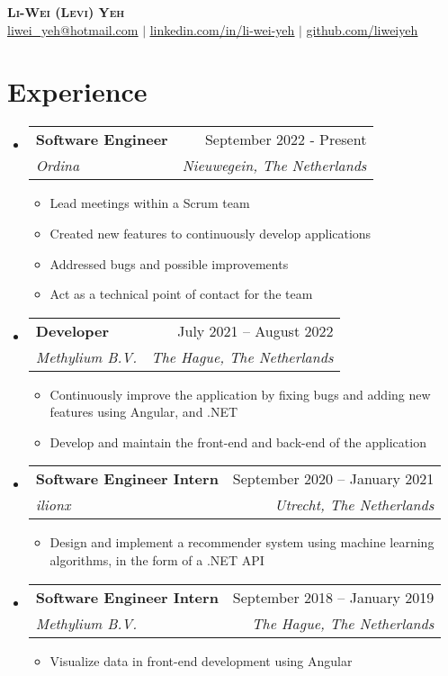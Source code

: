 \documentclass[letterpaper,11pt]{article}
\makeatletter
\newcommand{\resumeItem}[1]{
	\item\small{
		{#1 \vspace{-2pt}}
	}
}
\newcommand{\resumeSubheading}[4]{
	\vspace{4pt}\item
	\begin{tabular*}{0.97\textwidth}[t]{l@{\extracolsep{\fill}}r}
		\textbf{#1} & #2 \\
		\textit{\small#3} & \textit{\small #4} \\
	\end{tabular*}\vspace{-7pt}
}
\newcommand{\resumeSubHeadingListStart}{\begin{itemize}[leftmargin=0.15in, label={}]}
\newcommand{\resumeSubHeadingListEnd}{\end{itemize}}
\newcommand{\resumeItemListStart}{\begin{itemize}}
\newcommand{\resumeItemListEnd}{\end{itemize}\vspace{-5pt}}
\makeatother
\begin{document}
	
	\begin{center}
		\textbf{\Huge \scshape Li-Wei (Levi) Yeh} \\ \vspace{1pt}
		\small \href{mailto:liwei_yeh@hotmail.com}{\underline{liwei\_yeh@hotmail.com}} $|$ 
		\href{https://www.linkedin.com/in/li-wei-yeh/}{\underline{linkedin.com/in/li-wei-yeh}} $|$
		\href{https://github.com/LiWeiYeh/}{\underline{github.com/liweiyeh}}
	\end{center}
	
	
	
	\section{Experience}
	\resumeSubHeadingListStart
	
	\resumeSubheading
	{Software Engineer}{September 2022 - Present}
	{Ordina}{Nieuwegein, The Netherlands}
	\resumeItemListStart
	\resumeItem{Lead meetings within a Scrum team}\\
	\resumeItem{Created new features to continuously develop applications}\\
	\resumeItem{Addressed bugs and possible improvements}\\
	\resumeItem{Act as a technical point of contact for the team}\\
	\resumeItemListEnd
	
	\resumeSubheading
	{Developer}{July 2021 – August 2022}
	{Methylium B.V.}{The Hague, The Netherlands}
	\resumeItemListStart
	\resumeItem{Continuously improve the application by fixing bugs and adding new\\ 
		features using Angular, and .NET}
	\resumeItem{Develop and maintain the front-end and back-end of the application}
	\resumeItemListEnd
	
	\resumeSubheading
	{Software Engineer Intern}{September 2020 -- January 2021}
	{ilionx}{Utrecht, The Netherlands}
	\resumeItemListStart
	\resumeItem{Design and implement a recommender system using machine learning\\
		algorithms, in the form of a .NET API}
	\resumeItemListEnd
	
	\resumeSubheading
	{Software Engineer Intern}{September 2018 -- January 2019}
	{Methylium B.V.}{The Hague, The Netherlands}
	\resumeItemListStart
	\resumeItem{Visualize data in front-end development using Angular}
	\resumeItemListEnd
	
	\resumeSubHeadingListEnd
	
\end{document}
